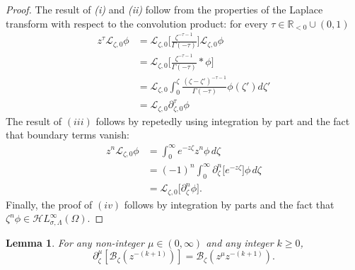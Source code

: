 \documentclass{article}
\newcommand{\singexp}[2]{\mathcal{H}L^\infty_{#1, #2}}
\newcommand{\R}{\mathbb{R}}
\newcommand{\fracderiv}[3]{\partial^{#1}_{#2, #3}}
\newcommand{\laplace}{\mathcal{L}}
\newcommand{\borel}{\mathcal{B}}
\theoremstyle{definition}
\theoremstyle{plain}
\newtheorem{lemma}[definition]{Lemma}
\begin{document}
\begin{proof}
   
   The result of \emph{(i)} and \emph{(ii)} follow from the properties of the Laplace transform with respect to the convolution product: for every $\tau\in\R_{<0}\cup(0,1)$
    \begin{align*}
        z^\tau\laplace_{\zeta,0}\phi&=\laplace_{\zeta,0}\Big[\frac{\zeta^{-\tau-1}}{\Gamma(-\tau)}\Big] \laplace_{\zeta,0}\phi\\
        &=\laplace_{\zeta,0}\Big[\frac{\zeta^{-\tau-1}}{\Gamma(-\tau)}\ast \phi\Big]\\
        &=\laplace_{\zeta,0} \int_0^{\zeta}\frac{(\zeta-\zeta')^{-\tau-1}}{\Gamma(-\tau)} \phi(\zeta') d\zeta'\\
        &=\laplace_{\zeta,0}\fracderiv{\tau}{\zeta}{0}\phi
        \end{align*}
        The result of $(iii)$ follows by repetedly using integration by part and the fact that boundary terms vanish:
\begin{align*}
    z^n\laplace_{\zeta,0}\phi&=\int_0^\infty e^{-z\zeta} z^n \phi \, d\zeta\\
    &=(-1)^n\int_0^\infty \partial_\zeta^n \big[e^{-z\zeta}\big]  \phi\, d\zeta\\
    &=\laplace_{\zeta,0}\big[\partial_\zeta^n \phi\big].
\end{align*}
     Finally, the proof of $(iv)$ follows by integration by parts and the fact that $\zeta^n\phi\in\singexp{\sigma}{\Lambda}(\Omega)$.   
\end{proof}
\begin{lemma}\label{lem:frac-deriv-Borel}
For any non-integer $\mu \in (0, \infty)$ and any integer $k \ge 0$,
\[ \partial^\mu_{\zeta } \left[ \borel_\zeta \left(z^{-(k+1)}\right) \right] =  \borel_\zeta \left(z^\mu z^{-(k+1)}\right). \]
\end{lemma}
\end{document}
